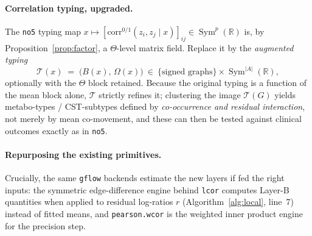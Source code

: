 \documentclass[11pt]{article}
\theoremstyle{definition}
\theoremstyle{plain}
\theoremstyle{remark}
\newcommand{\R}{\mathbb{R}}
\newcommand{\1}{\mathbf{1}}
\newcommand{\Sym}{\operatorname{Sym}}
\newcommand{\Prec}{\Omega}
\newcommand{\Edge}{B}
\begin{document}
\paragraph{Correlation typing, upgraded.}
The \texttt{no5} typing map $x\mapsto[\mathrm{corr}^{0/1}(z_i,z_j\mid x)]_{ij}
\in\Sym^{p}(\R)$ is, by Proposition~\ref{prop:factor}, a $\Theta$-level matrix
field. Replace it by the \emph{augmented typing}
\[
  \mathcal{T}(x)\;=\;\big(\Edge(x),\,\Prec(x)\big)\ \in\
  \{\text{signed graphs}\}\times\Sym^{|A|}(\R),
\]
optionally with the $\Theta$ block retained. Because the original typing is a
function of the mean block alone, $\mathcal{T}$ strictly refines it; clustering
the image $\mathcal{T}(G)$ yields metabo-types / CST-subtypes defined by
\emph{co-occurrence and residual interaction}, not merely by mean co-movement,
and these can then be tested against clinical outcomes exactly as in \texttt{no5}.

\paragraph{Repurposing the existing primitives.}
Crucially, the same \texttt{gflow} backends estimate the new layers if fed the
right inputs: the symmetric edge-difference engine behind \texttt{lcor} computes
Layer-B quantities when applied to residual log-ratios $r$ (Algorithm~\ref{alg:local},
line~7) instead of fitted means, and \texttt{pearson.wcor} is the weighted inner
product engine for the precision step.
\end{document}

